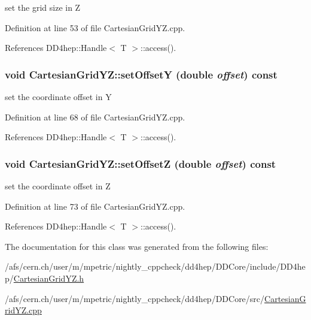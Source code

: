 set the grid size in Z 

Definition at line 53 of file CartesianGridYZ.cpp.

References DD4hep::Handle$<$ T $>$::access().\hypertarget{class_d_d4hep_1_1_geometry_1_1_cartesian_grid_y_z_a7399a2d921fb91e013cedacb0571394b}{
\subsubsection[{setOffsetY}]{\setlength{\rightskip}{0pt plus 5cm}void CartesianGridYZ::setOffsetY (double {\em offset}) const}}
\label{class_d_d4hep_1_1_geometry_1_1_cartesian_grid_y_z_a7399a2d921fb91e013cedacb0571394b}


set the coordinate offset in Y 

Definition at line 68 of file CartesianGridYZ.cpp.

References DD4hep::Handle$<$ T $>$::access().\hypertarget{class_d_d4hep_1_1_geometry_1_1_cartesian_grid_y_z_ab079e1c43643989e382a47e3b8459f99}{
\subsubsection[{setOffsetZ}]{\setlength{\rightskip}{0pt plus 5cm}void CartesianGridYZ::setOffsetZ (double {\em offset}) const}}
\label{class_d_d4hep_1_1_geometry_1_1_cartesian_grid_y_z_ab079e1c43643989e382a47e3b8459f99}


set the coordinate offset in Z 

Definition at line 73 of file CartesianGridYZ.cpp.

References DD4hep::Handle$<$ T $>$::access().

The documentation for this class was generated from the following files:\begin{DoxyCompactItemize}
\item 
/afs/cern.ch/user/m/mpetric/nightly\_\-cppcheck/dd4hep/DDCore/include/DD4hep/\hyperlink{_d_d_core_2include_2_d_d4hep_2_cartesian_grid_y_z_8h}{CartesianGridYZ.h}\item 
/afs/cern.ch/user/m/mpetric/nightly\_\-cppcheck/dd4hep/DDCore/src/\hyperlink{_d_d_core_2src_2_cartesian_grid_y_z_8cpp}{CartesianGridYZ.cpp}\end{DoxyCompactItemize}
